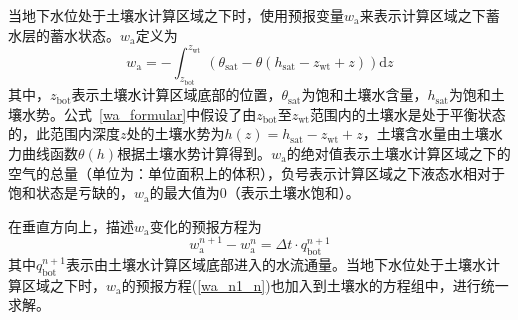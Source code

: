 当地下水位处于土壤水计算区域之下时，使用预报变量$w_{\mathrm {a}} $来表示计算区域之下蓄水层的蓄水状态。$w_{\mathrm {a}} $定义为
\begin{equation} \label{wa_formular}
  w_{\mathrm{a}}=-\int_{z_{\mathrm{bot}}}^{z_{\mathrm{wt}}}\left(\theta_{\mathrm{sat}}-\theta\left(h_{\mathrm{sat}}-z_{\mathrm{wt}}+z\right)\right){\mathrm { d}} z
\end{equation}
其中，$z_{\mathrm{bot}}$表示土壤水计算区域底部的位置，$\theta_{\mathrm {sat}} $为饱和土壤水含量，$h_{\mathrm {sat}} $为饱和土壤水势。公式~\eqref{wa_formular}中假设了由$z_{\mathrm{bot}}$至$z_{\mathrm{wt}}$范围内的土壤水是处于平衡状态的，此范围内深度$z$处的土壤水势为$h\left(z\right)=h_{\mathrm{sat}}-z_{\mathrm{wt}}+z$，土壤含水量由土壤水力曲线函数$\theta(h)$根据土壤水势计算得到。$w_{\mathrm {a}} $的绝对值表示土壤水计算区域之下的空气的总量（单位为：单位面积上的体积），负号表示计算区域之下液态水相对于饱和状态是亏缺的，$w_{\mathrm {a}} $的最大值为0（表示土壤水饱和）。

在垂直方向上，描述$w_{\mathrm {a}} $变化的预报方程为
\begin{equation}\label{wa_n1_n}
  w_{\mathrm{a}}^{n+1}-w_{\mathrm{a}}^{n}=\Delta t \cdot q_{\mathrm{bot}}^{n+1}
\end{equation}
其中$q_{\mathrm{bot}}^{n+1}$表示由土壤水计算区域底部进入的水流通量。当地下水位处于土壤水计算区域之下时，$w_{\mathrm {a}} $的预报方程(\ref{wa_n1_n})也加入到土壤水的方程组中，进行统一求解。

